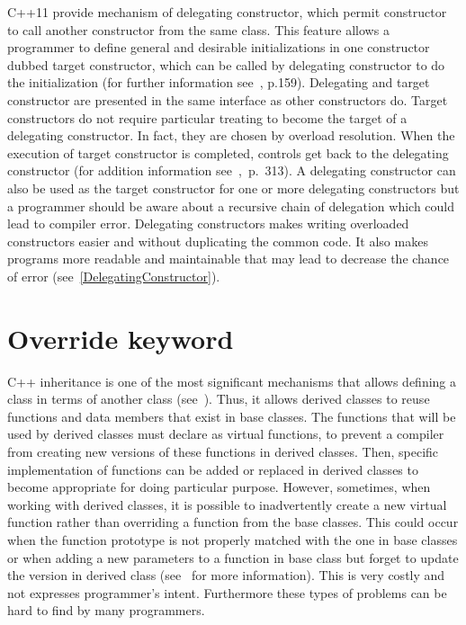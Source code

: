 \documentclass[11pt]{report}
\begin{document}
C++11 provide mechanism of delegating constructor, which permit constructor to call another constructor from the same class. This feature allows a programmer to define general and desirable initializations in one constructor dubbed target constructor, which can be called by delegating constructor to do the initialization (for further information see~\cite{Gregorie:professionalcpp}, p.159). Delegating and target constructor are presented in the same interface as other constructors do. Target constructors do not require particular treating to become the target of a delegating constructor. In fact, they are chosen by overload resolution. When the execution of target constructor is completed, controls get back to the delegating constructor (for addition information see~\cite{Overland:2011:CWF},~p.~313). A delegating constructor can also be used as the target constructor for one or more delegating constructors but a programmer should be aware about a recursive chain of delegation which could lead to compiler error. Delegating constructors makes writing overloaded constructors easier and without duplicating the common code. It also makes programs more readable and maintainable that may lead to decrease the chance of error (see~\ref{DelegatingConstructor}).

\section{Override keyword}
\label{section: Override keyword}
C++ inheritance is one of the most significant mechanisms that allows defining a class in terms of another class (see~\cite{Stroustrup:2012:Cpp11}). Thus, it allows derived classes to reuse functions and data members that exist in base classes. The functions that will be used by derived classes must declare as virtual functions, to prevent a compiler from creating new versions of these functions in derived classes. Then, specific implementation of functions can be added or replaced in derived classes to become appropriate for doing particular purpose. However, sometimes, when working with derived classes, it is possible to inadvertently create a new virtual function rather than overriding a function from the base classes. This could occur when the function prototype is not properly matched with the one in base classes or when adding a new parameters to a function in base class but forget to update the version in derived class (see~\cite{Stroustrup:2012:Cpp11} for more information). This is very costly and not expresses programmer's intent. Furthermore these types of problems can be hard to find by many programmers.
\end{document}
